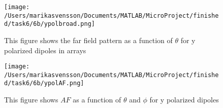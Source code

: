 \begin{figure}[h]
\centering
\texttt{[image: /Users/marikasvensson/Documents/MATLAB/MicroProject/finished/task6/6b/ypolbroad.png]}
\caption{This figure shows the far field pattern as a function of $\theta$ for y polarized dipoles in arrays}
\label{task6b:ypolHpat}
\end{figure}

\begin{figure}[h]
\centering
\texttt{[image: /Users/marikasvensson/Documents/MATLAB/MicroProject/finished/task6/6b/ypolAF.png]}
\caption{This figure shows $AF$ as a function of $\theta$ and $\phi$ for y polarized dipoles}
\label{task6b:ypolAF}
\end{figure}


